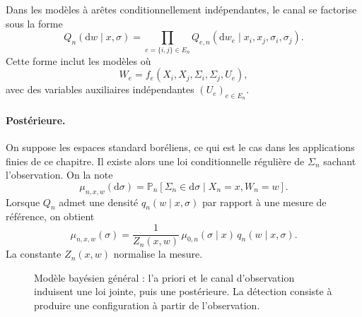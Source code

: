 Dans les modèles à arêtes conditionnellement indépendantes, le canal se factorise sous la forme
\begin{equation}
    Q_n(\mathrm dw\mid x,
    \sigma)
    =
    \prod_{e=\{i,j\}\in E_n}Q_{e,n}(\mathrm dw_e\mid x_i,x_j,\sigma_i,\sigma_j).
    \label{eq:chapII_canal_produit}
\end{equation}
Cette forme inclut les modèles où
\[
    W_e=f_e(X_i,X_j,\Sigma_i,\Sigma_j,U_e),
\]
avec des variables auxiliaires indépendantes $(U_e)_{e\in E_n}$.

\paragraph{Postérieure.}
On suppose les espaces standard boréliens, ce qui est le cas dans les applications finies de ce chapitre. Il existe alors une loi conditionnelle régulière de $\Sigma_n$ sachant l'observation. On la note
\begin{equation}
    \mu_{n,x,w}(\mathrm d\sigma)
    =
    \mathbb P_n\left[\Sigma_n\in\mathrm d\sigma\mid X_n=x,W_n=w\right].
    \label{eq:chapII_posterieure_def}
\end{equation}
Lorsque $Q_n$ admet une densité $q_n(w\mid x,\sigma)$ par rapport à une mesure de référence, on obtient
\begin{equation}
    \mu_{n,x,w}(\sigma)
    =
    \frac{1}{Z_n(x,w)}\,
    \mu_{0,n}(\sigma\mid x)\,q_n(w\mid x,\sigma).
    \label{eq:chapII_posterieure_densite}
\end{equation}
La constante $Z_n(x,w)$ normalise la mesure.

\begin{figure}[H]
\centering
{}
\caption{Modèle bayésien général : l'a priori et le canal d'observation induisent une loi jointe, puis une postérieure. La détection consiste à produire une configuration à partir de l'observation.}
\label{fig:chapII_modele_bayesien}
\end{figure}

